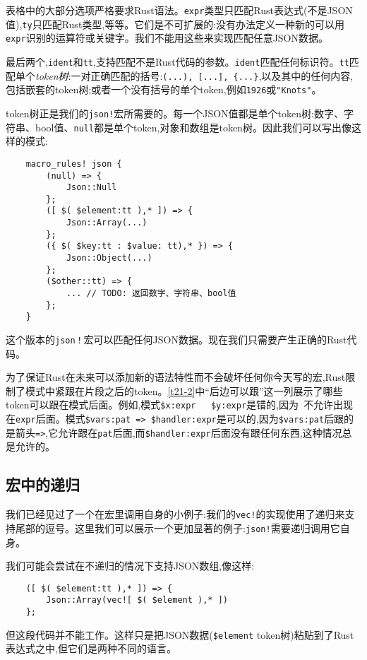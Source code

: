 表格中的大部分选项严格要求Rust语法。\texttt{expr}类型只匹配Rust表达式(不是JSON值),\texttt{ty}只匹配Rust类型,等等。它们是不可扩展的:没有办法定义一种新的可以用\texttt{expr}识别的运算符或关键字。我们不能用这些来实现匹配任意JSON数据。

最后两个,\texttt{ident}和\texttt{tt},支持匹配不是Rust代码的参数。\texttt{ident}匹配任何标识符。\texttt{tt}匹配单个\emph{token树}:一对正确匹配的括号:\texttt{(...), [...], \{...\}},以及其中的任何内容,包括嵌套的token树;或者一个没有括号的单个token,例如\texttt{1926}或\texttt{"Knots"}。

token树正是我们的\texttt{json!}宏所需要的。每一个JSON值都是单个token树:数字、字符串、bool值、\texttt{null}都是单个token,对象和数组是token树。因此我们可以写出像这样的模式:
\begin{verbatim}
    macro_rules! json {
        (null) => {
            Json::Null
        };
        ([ $( $element:tt ),* ]) => {
            Json::Array(...)
        };
        ({ $( $key:tt : $value: tt),* }) => {
            Json::Object(...)
        };
        ($other::tt) => {
            ... // TODO: 返回数字、字符串、bool值
        };
    }
\end{verbatim}

这个版本的\texttt{json！}宏可以匹配任何JSON数据。现在我们只需要产生正确的Rust代码。

为了保证Rust在未来可以添加新的语法特性而不会破坏任何你今天写的宏,Rust限制了模式中紧跟在片段之后的token。\autoref{t21-2}中“后边可以跟”这一列展示了哪些token可以跟在模式后面。例如,模式\texttt{\$x:expr ~ \$y:expr}是错的,因为\texttt{~}不允许出现在\texttt{expr}后面。模式\texttt{\$vars:pat => \$handler:expr}是可以的,因为\texttt{\$vars:pat}后跟的是箭头\texttt{=>},它允许跟在\texttt{pat}后面,而\texttt{\$handler:expr}后面没有跟任何东西,这种情况总是允许的。

\subsection{宏中的递归}
我们已经见过了一个在宏里调用自身的小例子:我们的\texttt{vec!}的实现使用了递归来支持尾部的逗号。这里我们可以展示一个更加显著的例子:\texttt{json!}需要递归调用它自身。

我们可能会尝试在不递归的情况下支持JSON数组,像这样:
\begin{verbatim}
    ([ $( $element:tt ),* ]) => {
        Json::Array(vec![ $( $element ),* ])
    };
\end{verbatim}
但这段代码并不能工作。这样只是把JSON数据(\texttt{\$element} token树)粘贴到了Rust表达式之中,但它们是两种不同的语言。

